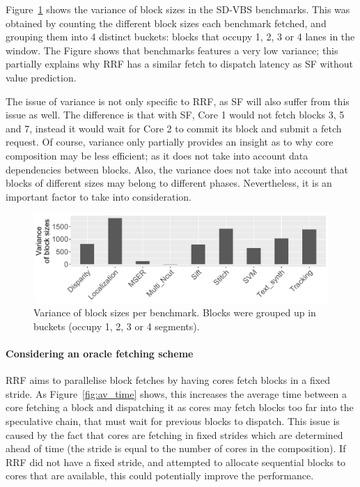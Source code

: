 Figure~\ref{fig:variance} shows the variance of block sizes in the SD-VBS benchmarks.
This was obtained by counting the different block sizes each benchmark fetched, and grouping them into 4 distinct buckets: blocks that occupy 1, 2, 3 or 4 lanes in the window.
The Figure shows that benchmarks  features a very low variance; this partially explains why RRF has a similar fetch to dispatch latency as SF without value prediction.

The issue of variance is not only specific to RRF, as SF will also suffer from this issue as well.
The difference is that with SF, Core 1 would not fetch blocks 3, 5 and 7, instead it would wait for Core 2 to commit its block and submit a fetch request.
Of course, variance only partially provides an insight as to why core composition may be less efficient; as it does not take into account data dependencies between blocks.
Also, the variance does not take into account that blocks of different sizes may belong to different phases.
Nevertheless, it is an important factor to take into consideration.

\begin{figure}[t]
    \centering
    \includegraphics[width=1\textwidth]{chapter3/graphics/variance.pdf}
    \caption{Variance of block sizes per benchmark. Blocks were grouped up in buckets (occupy 1, 2, 3 or 4 segments).}
    \label{fig:variance}
	\vspace{1em}
\end{figure}



\paragraph*{Considering an oracle fetching scheme}

RRF aims to parallelise block fetches by having cores fetch blocks in a fixed stride.
As Figure~\ref{fig:av_time} shows, this increases the average time between a core fetching a block and dispatching it as cores may fetch blocks too far into the speculative chain, that must wait for previous blocks to dispatch.
This issue is caused by the fact that cores are fetching in fixed strides which are determined ahead of time (the stride is equal to the number of cores in the composition).
If RRF did not have a fixed stride, and attempted to allocate sequential blocks to cores that are available, this could potentially improve the performance. 

